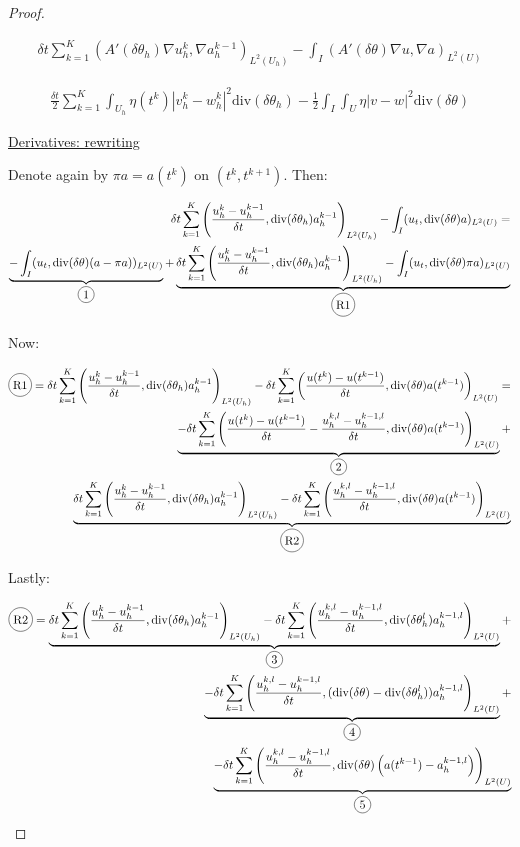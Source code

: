 \documentclass[english,a4paper,10pt,oneside]{scrbook}	%
\theoremstyle{break}
\newenvironment{mproof}[1][\proofname]{%
  \begin{proof}[#1]$ $\par\nobreak\ignorespaces
}{%
  \end{proof}
}
\renewcommand*{\proofname}{Proof}
\theoremstyle{remark}
\newcommand{\te}{\theta}
\newcommand{\dive}{\text{div}}
\newcommand*\circled[1]{\tikz[baseline=(char.base)]{
            \node[shape=circle,draw,inner sep=2pt] (char) {#1};}}
\begin{document}
\begin{mproof}
\begin{align*}
	\delta t \sum_{k=1}^{K} (A'(\delta \theta_h ) \nabla u_h^k, \nabla a_h^{k-1})_{L^2(U_h)} - \int_I (A'(\delta\te )\nabla u, \nabla a)_{L^2(U)}
\end{align*}

\begin{align*}
	\frac{\delta t}{2} \sum_{k=1}^{K} \int_{U_h} \eta(t^k)|v_h^k-w_h^k|^2  \dive(\delta \theta_h ) - \frac{1}{2}\int_I\int_{U}\eta |v-w|^2\dive(\delta \te)
\end{align*}

\underline{Derivatives: rewriting}

Denote again by $\pi a = a(t^k)$ on $(t^k,t^{k+1})$. Then:

\begin{align*}
	\delta t \sum_{k=1}^{K} \left (\frac{u_h^{k}-u_h^{k-1}}{\delta t}, \dive(\delta \theta_h ) a_h^{k-1} \right )_{L^2(U_h)}  - \int_I (u_t , \dive(\delta \te) a)_{L^2(U)} = \\
	\underbrace{- \int_I (u_t , \dive(\delta \te) (a -\pi a))_{L^2(U)}}_{\circled{1}}+ \underbrace{\delta t \sum_{k=1}^{K} \left (\frac{u_h^{k}-u_h^{k-1}}{\delta t}, \dive(\delta \theta_h ) a_h^{k-1} \right )_{L^2(U_h)} - \int_I (u_t , \dive(\delta \te) \pi a)_{L^2(U)}}_{\circled{R1}}
\end{align*}

Now:

\begin{align*}
	\circled{R1} = \delta t \sum_{k=1}^{K} \left (\frac{u_h^{k}-u_h^{k-1}}{\delta t}, \dive(\delta \theta_h ) a_h^{k-1} \right )_{L^2(U_h)} - \delta t \sum_{k=1}^{K}\left (\frac{u(t^{k})-u(t^{k-1})}{\delta t} , \dive(\delta \te)  a(t^{k-1})\right )_{L^2(U)}=\\
\underbrace{- \delta t \sum_{k=1}^{K}\left (\frac{u(t^{k})-u(t^{k-1})}{\delta t} -\frac{u^{k,l}_h-u^{k-1,l}_h}{\delta t} , \dive(\delta \te)  a(t^{k-1})\right )_{L^2(U)}}_{\circled{2}}+\\ \underbrace{\delta t \sum_{k=1}^{K} \left (\frac{u_h^{k}-u_h^{k-1}}{\delta t}, \dive(\delta \theta_h ) a_h^{k-1} \right )_{L^2(U_h)}- \delta t \sum_{k=1}^{K}\left (\frac{u^{k,l}_h-u^{k-1,l}_h}{\delta t} , \dive(\delta \te)  a(t^{k-1})\right )_{L^2(U)}}_{\circled{R2}} 
\end{align*}

Lastly:

\begin{align*}
	\circled{R2} = \underbrace{\delta t \sum_{k=1}^{K} \left (\frac{u_h^{k}-u_h^{k-1}}{\delta t}, \dive(\delta \theta_h ) a_h^{k-1} \right )_{L^2(U_h)}
		- \delta t \sum_{k=1}^{K}\left (\frac{u^{k,l}_h-u^{k-1,l}_h}{\delta t} , \dive(\delta \te_h^l)  a_h^{k-1,l}\right )_{L^2(U)} }_{\circled{3}}+ \\
	\underbrace{- \delta t \sum_{k=1}^{K}\left (\frac{u^{k,l}_h-u^{k-1,l}_h}{\delta t} , (\dive(\delta \te) - \dive(\delta \te_h^l)  )a_h^{k-1,l}\right )_{L^2(U)}}_{\circled{4}} + \\
	\underbrace{- \delta t \sum_{k=1}^{K}\left (\frac{u^{k,l}_h-u^{k-1,l}_h}{\delta t} , \dive(\delta \te) \left(a(t^{k-1})-a_h^{k-1,l}\right)\right )_{L^2(U)}}_{\circled{5}}
\end{align*}


\end{mproof}
\end{document}
